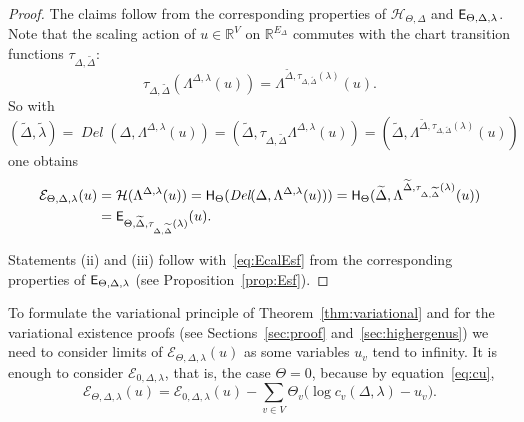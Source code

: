 \documentclass[a4paper, 11pt]{article}
\newcommand{\R}{\mathbb{R}}
\newcommand{\Deltil}{\widetilde{\Delta}}
\newcommand{\lamtil}{\tilde{\lambda}}
\newcommand{\Del}{\operatorname{\textit{Del}}}
\newcommand{\Hcal}{\mathcal{H}}
\newcommand{\Ecal}{\mathcal{E}}
\newcommand{\Hsf}{\scalebox{0.94}{$\mathsf{H}$}}
\newcommand{\Esf}{\scalebox{0.94}{$\mathsf{E}$}}
\theoremstyle{plain}
\theoremstyle{definition}
\begin{document}
\begin{proof}
  The claims follow from the corresponding properties of
  $\Hcal_{\Theta,\Delta}$ and $\Esf_{\Theta,\Delta,\lambda}$. Note
  that the scaling action of $u\in\R^{V}$ on $\R^{E_{\Delta}}$
  commutes with the chart transition functions
  $\tau_{\Delta,\Deltil}$:
  \begin{equation}
    \label{eq:taucommute}
    \tau_{\Delta,\Deltil}(\Lambda^{\Delta,\lambda}(u))
    =\Lambda^{\Deltil,\tau_{\Delta,\Deltil}(\lambda)}(u).
  \end{equation}
  So with
  \begin{equation*}
    (\Deltil,\lamtil)=\Del(\Delta,\Lambda^{\Delta,\lambda}(u))
    =(\Deltil,\tau_{\Delta,\Deltil}\Lambda^{\Delta,\lambda}(u))
    =(\Deltil,\Lambda^{\Deltil,\tau_{\Delta,\Deltil}(\lambda)}(u))
  \end{equation*}
  one obtains
  \begin{equation}
    \label{eq:EcalEsf}
    \begin{split}
      \Ecal_{\Theta,\Delta,\lambda}(u)
      &=\Hcal(\Lambda^{\Delta,\lambda}(u))
      =\Hsf_{\Theta}(\Del(\Delta,\Lambda^{\Delta,\lambda}(u)))
      =\Hsf_{\Theta}(\Deltil,\Lambda^{\Deltil,\tau_{\Delta,\Deltil}(\lambda)}(u))\\
      &=\Esf_{\Theta,\Deltil,\tau_{\Delta,\Deltil}(\lambda)}(u).
    \end{split}
  \end{equation}

  Statements (ii) and (iii) follow with~\eqref{eq:EcalEsf} from the
  corresponding properties of $\Esf_{\Theta,\Delta,\lambda}$ (see
  Proposition~\ref{prop:Esf}).
\end{proof}

To formulate the variational principle of
Theorem~\ref{thm:variational} and for the variational existence proofs
(see Sections~\ref{sec:proof} and~\ref{sec:highergenus}) we need to
consider limits of $\Ecal_{\Theta,\Delta,\lambda}(u)$ as some
variables $u_{v}$ tend to infinity. It is enough to consider
$\Ecal_{0,\Delta,\lambda}$, that is, the case $\Theta=0$, because by
equation~\eqref{eq:cu},
\begin{equation}
  \label{eq:EcalThetaEcal0}
  \Ecal_{\Theta,\Delta,\lambda}(u)=\Ecal_{0,\Delta,\lambda}(u)
  -\sum_{v\in V}
  \Theta_{v}\big(\log c_{v}(\Delta,\lambda)-u_{v}\big).
\end{equation}
\end{document}
